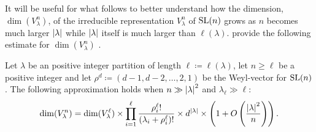 \documentclass[notitlepage, 10pt]{article}
\begin{document}
It will be useful for what follows to better understand how the dimension, $\dim(V_{\lambda}^{n})$, of the irreducible representation $V_{\lambda}^{n}$ of $\operatorname{SL}(n)$ grows as $n$ becomes much larger $\left|\lambda\right|$ while $\left|\lambda\right|$ itself is much larger than $\ell(\lambda)$.
 provide the following estimate for $\dim(V_{\lambda}^{n})$ \cite{itzykson1966unitary}.
\begin{lem}
    \label{lem:in_estimate}
    Let $\lambda$ be an positive integer partition of length $\ell \coloneqq \ell(\lambda)$, let $n \geq \ell$ be a positive integer and let $\rho^d \coloneqq (d-1, d-2, \ldots, 2, 1)$ be the Weyl-vector for $\operatorname{SL}(n)$.
    The following approximation holds when $n \gg \left|\lambda\right|^2$ and $\lambda_{\ell} \gg \ell$:
    \begin{equation}
        \label{eq:in_estimate}
        \dim(V_{\lambda}^{n}) = \dim(V_{\lambda}^{\ell}) \times \prod_{i=1}^{\ell}\frac{\rho^{\ell}_{i}!}{(\lambda_i + \rho^{\ell}_{i}) !}  \times d^{\left|\lambda\right|} \times \left(1 + O\left(\frac{\left|\lambda\right|^{2}}{n}\right)\right).
    \end{equation}
\end{lem}
\end{document}
